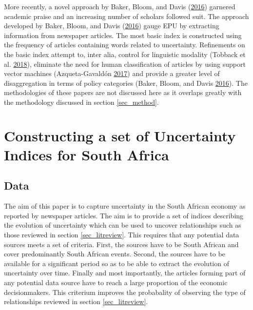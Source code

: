 \documentclass[11pt,preprint, authoryear]{elsarticle}
\numberwithin{equation}{section}
\numberwithin{figure}{section}
\numberwithin{table}{section}
\begin{document}
More recently, a novel approach by Baker, Bloom, and Davis
(\protect\hyperlink{ref-Baker2016}{2016}) garnered academic praise and
an increasing number of scholars followed suit. The approach developed
by Baker, Bloom, and Davis (\protect\hyperlink{ref-Baker2016}{2016})
gauge EPU by extracting information from newspaper articles. The most
basic index is constructed using the frequency of articles containing
words related to uncertainty. Refinements on the basic index attempt to,
inter alia, control for linguistic modality (Tobback et al.
\protect\hyperlink{ref-Tobback2018}{2018}), eliminate the need for human
classification of articles by using support vector machines
(Azqueta-Gavaldón \protect\hyperlink{ref-Azqueta-Gavaldon2017}{2017})
and provide a greater level of disaggregation in terms of policy
categories (Baker, Bloom, and Davis
\protect\hyperlink{ref-Baker2016}{2016}). The methodologies of these
papers are not discussed here as it overlaps greatly with the
methodology discussed in section \ref{sec_method}.

\section{\texorpdfstring{Constructing a set of Uncertainty Indices for
South Africa
\label{sec_EPU}}{Constructing a set of Uncertainty Indices for South Africa }}\label{constructing-a-set-of-uncertainty-indices-for-south-africa}

\subsection{\texorpdfstring{Data \label{sec_data}}{Data }}\label{data}

The aim of this paper is to capture uncertainty in the South African
economy as reported by newspaper articles. The aim is to provide a set
of indices describing the evolution of uncertainty which can be used to
uncover relationships such as those reviewed in section
\ref{sec_litreview}. This requires that any potential data sources meets
a set of criteria. First, the sources have to be South African and cover
predominantly South African events. Second, the sources have to be
available for a significant period so as to be able to extract the
evolution of uncertainty over time. Finally and most importantly, the
articles forming part of any potential data source have to reach a large
proportion of the economic decisionmakers. This criterium improves the
probabality of observing the type of relationships reviewed in section
\ref{sec_litreview}.
\end{document}
